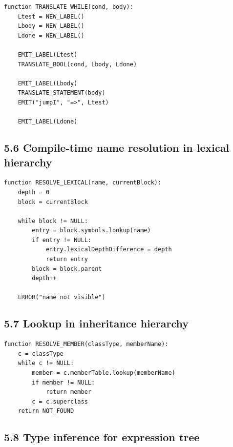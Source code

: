 \documentclass[10pt,letterpaper]{article}
\begin{document}
\begin{verbatim}
function TRANSLATE_WHILE(cond, body):
    Ltest = NEW_LABEL()
    Lbody = NEW_LABEL()
    Ldone = NEW_LABEL()

    EMIT_LABEL(Ltest)
    TRANSLATE_BOOL(cond, Lbody, Ldone)

    EMIT_LABEL(Lbody)
    TRANSLATE_STATEMENT(body)
    EMIT("jumpI", "=>", Ltest)

    EMIT_LABEL(Ldone)
\end{verbatim}

\subsection*{5.6 Compile-time name resolution in lexical hierarchy}
{}

\begin{verbatim}
function RESOLVE_LEXICAL(name, currentBlock):
    depth = 0
    block = currentBlock

    while block != NULL:
        entry = block.symbols.lookup(name)
        if entry != NULL:
            entry.lexicalDepthDifference = depth
            return entry
        block = block.parent
        depth++

    ERROR("name not visible")
\end{verbatim}

\subsection*{5.7 Lookup in inheritance hierarchy}
{}

\begin{verbatim}
function RESOLVE_MEMBER(classType, memberName):
    c = classType
    while c != NULL:
        member = c.memberTable.lookup(memberName)
        if member != NULL:
            return member
        c = c.superclass
    return NOT_FOUND
\end{verbatim}

\subsection*{5.8 Type inference for expression tree}
{}
\end{document}
